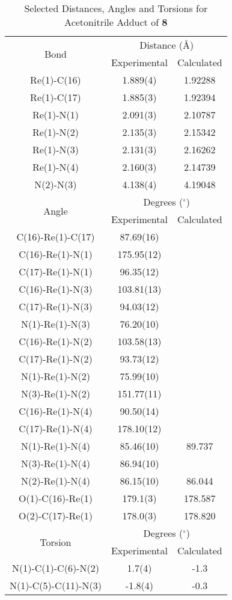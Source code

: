 \begin{table}[htbp]
  \centering
  \caption{Selected Distances, Angles and Torsions for Acetonitrile Adduct of \textbf{8}}
    \begin{tabular}{ccc}
    \toprule
	\multirow{2}{*}{Bond} & \multicolumn{2}{c}{Distance (\r{A})} \\ \cline{2-3}
     & Experimental & Calculated \\ \midrule
    Re(1)-C(16) & 1.889(4) & 1.92288 \\
    Re(1)-C(17) & 1.885(3) & 1.92394 \\
    Re(1)-N(1) & 2.091(3) & 2.10787 \\
    Re(1)-N(2) & 2.135(3) & 2.15342 \\
    Re(1)-N(3) & 2.131(3) & 2.16262 \\
    Re(1)-N(4) & 2.160(3) & 2.14739 \\ 
    N(2)-N(3) & 4.138(4) & 4.19048 \\ \midrule
	\multirow{2}{*}{Angle} & \multicolumn{2}{c}{Degrees ($^\circ$)} \\ \cline{2-3}
     & Experimental & Calculated \\ \midrule
    C(16)-Re(1)-C(17) & 87.69(16) & \\
    C(16)-Re(1)-N(1) & 175.95(12) & \\
    C(17)-Re(1)-N(1) & 96.35(12) & \\
    C(16)-Re(1)-N(3) & 103.81(13) & \\
    C(17)-Re(1)-N(3) & 94.03(12) & \\
    N(1)-Re(1)-N(3) & 76.20(10) & \\
    C(16)-Re(1)-N(2) & 103.58(13) & \\
    C(17)-Re(1)-N(2) & 93.73(12) & \\
    N(1)-Re(1)-N(2) & 75.99(10) & \\
    N(3)-Re(1)-N(2) & 151.77(11) & \\
    C(16)-Re(1)-N(4) & 90.50(14) & \\
    C(17)-Re(1)-N(4) & 178.10(12) & \\
    N(1)-Re(1)-N(4) & 85.46(10) & 89.737 \\
    N(3)-Re(1)-N(4) & 86.94(10) &  \\
    N(2)-Re(1)-N(4) & 86.15(10) & 86.044 \\
    O(1)-C(16)-Re(1) & 179.1(3) & 178.587 \\
    O(2)-C(17)-Re(1) & 178.0(3) & 178.820 \\
    \multirow{2}{*}{Torsion} & \multicolumn{2}{c}{Degrees ($^\circ$)} \\ \cline{2-3}
     & Experimental & Calculated \\ \midrule
    N(1)-C(1)-C(6)-N(2) & 1.7(4) & -1.3 \\
    N(1)-C(5)-C(11)-N(3) & -1.8(4) & -0.3 \\
    \bottomrule
    \end{tabular}%
  \label{tab.da8}%
\end{table}%
